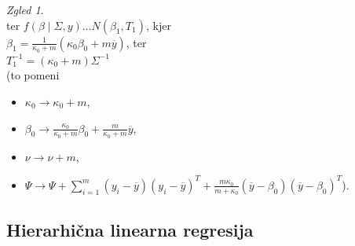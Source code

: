 \documentclass[a4paper, 12pt]{book}
\theoremstyle{definition}
\theoremstyle{remark}
\newtheorem*{exmp}{Zgled}
\begin{document}
\begin{itemize}
\begin{exmp}
\begin{equation*}
            \end{equation*}
            ter $f(\beta \mid \Sigma, y) \dots N(\beta_1, T_1)$, kjer \\
            $\beta_1 = \frac{1}{\kappa_0 + m} (\kappa_0 \beta_0 + m \overline{y})$, ter \\
            $T_1^{-1} = (\kappa_0 + m) \Sigma^{-1}$ \\
            (to pomeni
            \begin{itemize}[label={}]
                \item $\kappa_0 \to \kappa_0 + m$,
                \item $\beta_0 \to \frac{\kappa_0}{\kappa_0 + m} \beta_0 + \frac{m}{\kappa_0 + m}{\overline{y}}$,
                \item $\nu \to \nu + m$,
                \item $\Psi \to \Psi + \sum_{i=1}^m (y_i - \overline{y}) (y_i - \overline{y})^T
                    + \frac{m \kappa_0}{m + \kappa_0} (\overline{y} - \beta_0) (\overline{y} - \beta_0)^T$).
            \end{itemize}
        \end{exmp}
\end{itemize}



\subsection{Hierarhična linearna regresija}
\end{document}
